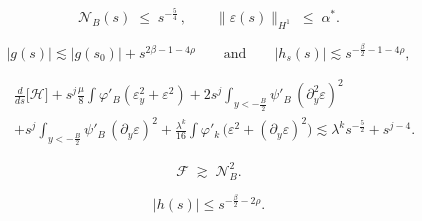\documentclass[10pt,a4paper]{amsart}
\newcommand{\vare}{{\varepsilon}}
\newcommand{\vphi}{{\varphi}}
\begin{document}
\begin{equation}\tag{BS2}\label{BS2}
        \mathcal{N}_B(s) \;\leq\; s^{-\frac{5}{4}}\,, \qquad \|\vare(s)\|_{H^1} \;\leq\; \alpha^*. 
\end{equation}

\begin{equation}\label{conseq_of_BS_on_g_and_hs}
    \lvert g(s) \rvert \lesssim \lvert g(s_0) \rvert  + s^{2\beta - 1-4\rho} \qquad \text{and}\qquad \lvert h_s(s) \rvert \lesssim s^{-\frac{\beta}{2}-1-4\rho},
\end{equation}

    \begin{equation}\label{Lyapounov_control_of_H}
    \begin{split}
        & \frac{d}{ds}\big[\mathcal{H}\big]+s^{j}\frac{\mu}{8}\int\vphi'_B(\vare_y^2+\vare^2) +2s^{j}\int_{y<-\frac B2}\psi'_B\,(\partial^2_y\vare)^2\\
        & +s^{j}\int_{y<-\frac B2} \psi'_B\,(\partial_y \vare)^2 +\frac{\lambda^k}{16}\int \vphi'_k\,\big(\vare^2 + (\partial_y\vare)^2 \big)
        \lesssim \lambda^ks^{ - \frac 52} + s^{j-4}.
    \end{split}
    \end{equation}

    \begin{equation}\label{coercivity_of_mathcal_F}
        \mathcal{F}\;\gtrsim\;\mathcal{N}^2_B.
    \end{equation}

\begin{equation}\tag{BS3}\label{BS3}
    \lvert h(s) \rvert \leq s^{-\frac{\beta}{2} - 2\rho}.
\end{equation}
\end{document}
